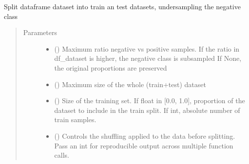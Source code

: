 \documentclass[letterpaper,10pt,english]{sphinxmanual}
\begin{document}
\begin{fulllineitems}
\begin{fulllineitems}
\end{fulllineitems}


\begin{fulllineitems}
\label{\detokenize{dc_classifier:src.domain_classifier.classifier.CorpusClassifier.train_test_split}}
\sphinxAtStartPar
Split dataframe dataset into train an test datasets, undersampling
the negative class
\begin{quote}\begin{description}
\item[{Parameters}] \leavevmode\begin{itemize}
\item {} 
\sphinxAtStartPar
{} () \textendash{} Maximum ratio negative vs positive samples. If the ratio in
df\_dataset is higher, the negative class is subsampled
If None, the original proportions are preserved

\item {} 
\sphinxAtStartPar
{} () \textendash{} Maximum size of the whole (train+test) dataset

\item {} 
\sphinxAtStartPar
{} () \textendash{} Size of the training set.
If float in {[}0.0, 1.0{]}, proportion of the dataset to include in the
train split.
If int, absolute number of train samples.

\item {} 
\sphinxAtStartPar
{} () \textendash{} Controls the shuffling applied to the data before splitting.
Pass an int for reproducible output across multiple function calls.

\end{itemize}


\end{description}
\end{quote}
\end{fulllineitems}
\end{fulllineitems}
\end{document}
